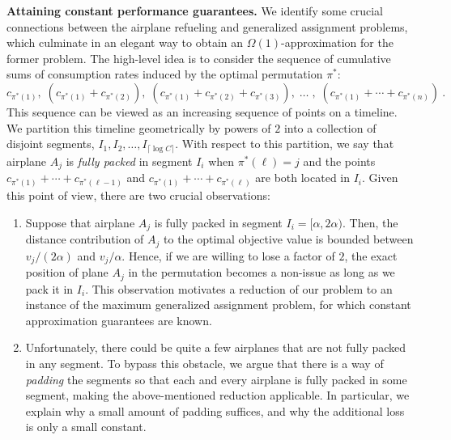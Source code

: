 \documentclass[11pt]{article}
\theoremstyle{plain}
\theoremstyle{definition}
\begin{document}
{\bf Attaining constant performance guarantees.} We identify some crucial connections between the airplane refueling and generalized assignment problems, which culminate in an elegant way to obtain an $\Omega(1)$-approximation for the former problem. The high-level idea is to consider the sequence of cumulative sums of consumption rates induced by the optimal permutation $\pi^*$:
\[ c_{ \pi^*(1) }, \; (c_{ \pi^*(1) } + c_{ \pi^*(2)}), \; (c_{ \pi^*(1) } + c_{ \pi^*(2) } + c_{ \pi^*(3) }), \; \ldots \; , \; (c_{ \pi^*(1) } + \cdots + c_{ \pi^*(n) }) \ . \]This sequence can be viewed as an increasing sequence of points on a timeline. We partition this timeline geometrically by powers of $2$ into a collection of disjoint segments, $I_1, I_2, \ldots, I_{\lceil \log C \rceil}$. With respect to this partition, we say that airplane $A_j$ is \textit{fully packed} in segment $I_i$ when $\pi^*( \ell ) = j$ and the points $c_{ \pi^*(1) } + \cdots + c_{ \pi^*(\ell-1) }$ and $c_{ \pi^*(1) } + \cdots + c_{ \pi^*(\ell) }$ are both located in $I_i$. Given this point of view, there are two crucial observations:
\begin{enumerate}
\item Suppose that airplane $A_j$ is fully packed in segment $I_i = [\alpha, 2 \alpha)$. Then, the distance contribution of $A_j$ to the optimal objective value is bounded between $v_j / (2 \alpha)$ and $v_j / \alpha$. Hence, if we are willing to lose a factor of $2$, the exact position of plane $A_j$ in the permutation becomes a non-issue as long as we pack it in $I_i$. This observation motivates a reduction of our problem to an instance of the maximum generalized assignment problem, for which constant approximation guarantees are known.

\item Unfortunately, there could be quite a few airplanes that are not fully packed in any segment. To bypass this obstacle, we argue that there is a way of \textit{padding} the segments so that each and every airplane is fully packed in some segment, making the above-mentioned reduction applicable. In particular, we explain why a small amount of padding suffices, and why the additional loss is only a small constant.
\end{enumerate}
\end{document}

